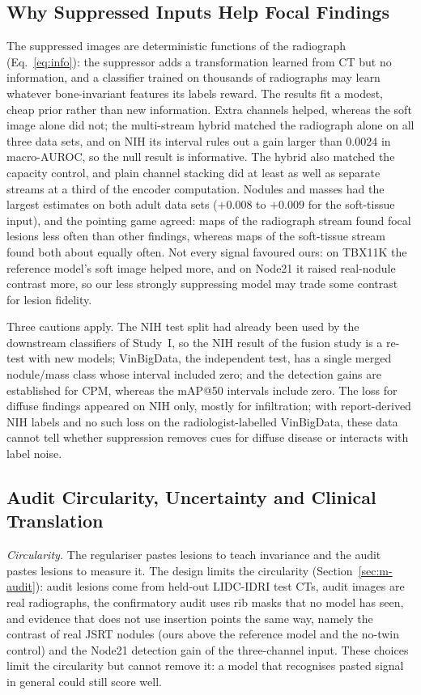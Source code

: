 \subsection{Why Suppressed Inputs Help Focal Findings}
\label{sec:d-focal}
The suppressed images are deterministic functions of the radiograph (Eq.~\eqref{eq:info}): the suppressor adds a transformation learned
from CT but no information, and a classifier trained on thousands of radiographs may learn whatever bone-invariant features its labels
reward. The results fit a modest, cheap prior rather than new information. Extra channels helped, whereas the soft image alone did not; the
multi-stream hybrid matched the radiograph alone on all three data sets, and on NIH its interval rules out a gain larger than 0.0024 in
macro-AUROC, so the null result is informative. The hybrid also matched the capacity control, and plain channel stacking did at least as
well as separate streams at a third of the encoder computation. Nodules and masses had the largest estimates on both adult data sets
($+0.008$ to $+0.009$ for the soft-tissue input), and the pointing game agreed: maps of the radiograph stream found focal lesions less often
than other findings, whereas maps of the soft-tissue stream found both about equally often. Not every signal favoured ours: on TBX11K the
reference model's soft image helped more, and on Node21 it raised real-nodule contrast more, so our less strongly suppressing model may
trade some contrast for lesion fidelity.

Three cautions apply. The NIH test split had already been used by the downstream classifiers of Study~I, so the NIH result of the fusion
study is a re-test with new models; VinBigData, the independent test, has a single merged nodule/mass class whose interval included zero;
and the detection gains are established for CPM, whereas the mAP@50 intervals include zero. The loss for diffuse findings appeared on NIH
only, mostly for infiltration; with report-derived NIH labels \cite{wang2017chestxray} and no such loss on the radiologist-labelled
VinBigData, these data cannot tell whether suppression removes cues for diffuse disease or interacts with label noise.

\subsection{Audit Circularity, Uncertainty and Clinical Translation}
\label{sec:d-translation}
\emph{Circularity.} The regulariser pastes lesions to teach invariance and the audit pastes lesions to measure it. The design limits the
circularity (Section~\ref{sec:m-audit}): audit lesions come from held-out LIDC-IDRI test CTs, audit images are real radiographs, the
confirmatory audit uses rib masks that no model has seen, and evidence that does not use insertion points the same way, namely the contrast
of real JSRT nodules (ours above the reference model and the no-twin control) and the Node21 detection gain of the three-channel input. These
choices limit the circularity but cannot remove it: a model that recognises pasted signal in general could still score well.

